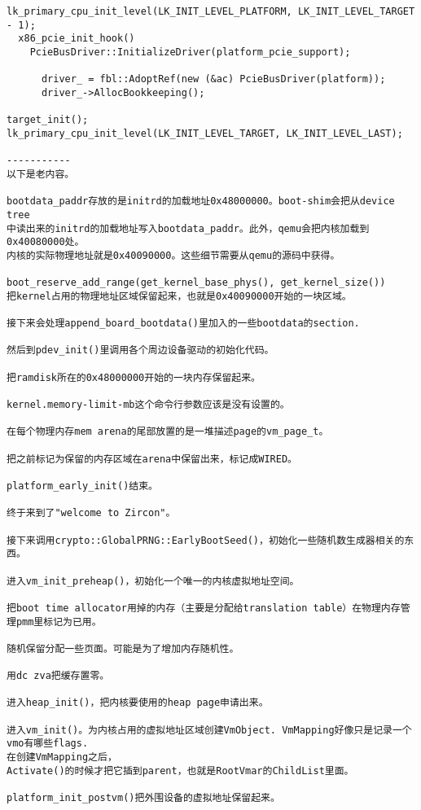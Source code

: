 \begin{verbatim}
lk_primary_cpu_init_level(LK_INIT_LEVEL_PLATFORM, LK_INIT_LEVEL_TARGET - 1);
  x86_pcie_init_hook()
    PcieBusDriver::InitializeDriver(platform_pcie_support);

      driver_ = fbl::AdoptRef(new (&ac) PcieBusDriver(platform));
      driver_->AllocBookkeeping();

target_init();
lk_primary_cpu_init_level(LK_INIT_LEVEL_TARGET, LK_INIT_LEVEL_LAST);

-----------
以下是老内容。

bootdata_paddr存放的是initrd的加载地址0x48000000。boot-shim会把从device tree
中读出来的initrd的加载地址写入bootdata_paddr。此外，qemu会把内核加载到0x40080000处。
内核的实际物理地址就是0x40090000。这些细节需要从qemu的源码中获得。

boot_reserve_add_range(get_kernel_base_phys(), get_kernel_size())
把kernel占用的物理地址区域保留起来，也就是0x40090000开始的一块区域。

接下来会处理append_board_bootdata()里加入的一些bootdata的section.

然后到pdev_init()里调用各个周边设备驱动的初始化代码。

把ramdisk所在的0x48000000开始的一块内存保留起来。

kernel.memory-limit-mb这个命令行参数应该是没有设置的。

在每个物理内存mem arena的尾部放置的是一堆描述page的vm_page_t。

把之前标记为保留的内存区域在arena中保留出来，标记成WIRED。

platform_early_init()结束。

终于来到了"welcome to Zircon"。

接下来调用crypto::GlobalPRNG::EarlyBootSeed()，初始化一些随机数生成器相关的东西。

进入vm_init_preheap()，初始化一个唯一的内核虚拟地址空间。

把boot time allocator用掉的内存（主要是分配给translation table）在物理内存管理pmm里标记为已用。

随机保留分配一些页面。可能是为了增加内存随机性。

用dc zva把缓存置零。

进入heap_init()，把内核要使用的heap page申请出来。

进入vm_init()。为内核占用的虚拟地址区域创建VmObject. VmMapping好像只是记录一个vmo有哪些flags. 
在创建VmMapping之后，
Activate()的时候才把它插到parent，也就是RootVmar的ChildList里面。

platform_init_postvm()把外围设备的虚拟地址保留起来。


\end{verbatim}
